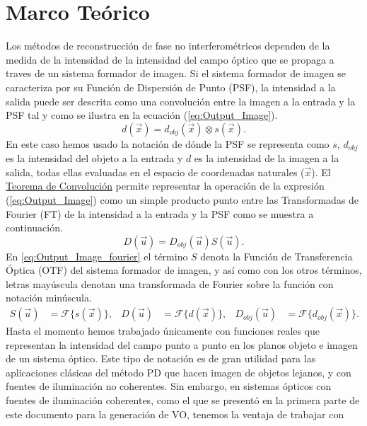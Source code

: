 \section{Marco Teórico}
\label{sec:ChPD_marco_teorico}
Los métodos de reconstrucción de fase no interferométricos dependen de
la medida de la intensidad de la intensidad del campo óptico que se
propaga a traves de un sistema formador de imagen. Si el sistema
formador de imagen se
caracteriza por su Función de Dispersión de Punto (PSF), la intensidad
a la salida puede ser descrita como una convolución entre la imagen a
la entrada y la PSF tal y como se ilustra en la ecuación
(\ref{eq:Output_Image}).
\begin{equation}\label{eq:Output_Image}
d(\vec{x}) = d_{obj}(\vec{x}) \otimes s(\vec{x}).
\end{equation}
En este caso hemos usado la notación de  dónde
la PSF se representa como $s$, $d_{obj}$ es la intensidad del objeto a
la entrada y $d$ es la intensidad de la imagen a la salida, todas
ellas evaluadas en el espacio de coordenadas naturales ($\vec{x}$). El
 \href{http://es.wikipedia.org/wiki/Teorema_de_convolución}{Teorema de
   Convolución} permite representar la operación de la expresión
 (\ref{eq:Output_Image}) como un simple producto punto entre las
 Transformadas de Fourier (FT) de la intensidad a la entrada y la
 PSF como se muestra a continuación. 
\begin{equation}\label{eq:Output_Image_fourier}
D(\vec{u}) = D_{obj}(\vec{u})S(\vec{u}).
\end{equation}
En \ref{eq:Output_Image_fourier} el término $S$ denota la Función de
Transferencia Óptica (OTF) del sistema formador de imagen, y así como
con los otros términos, letras mayúscula denotan una transformada de
Fourier sobre la función con notación minúscula.
\begin{align*} 
S(\vec{u})&= \mathcal{F}\{ s(\vec{x}) \},&D(\vec{u})&= \mathcal{F}\{ d(\vec{x}) \}, &D_{obj}(\vec{u})&= \mathcal{F}\{ d_{obj}(\vec{x}) \}. 
\end{align*}
Hasta el momento hemos trabajado únicamente con funciones reales que
representan la intensidad del campo punto a punto en los planos objeto
e imagen de un sistema óptico. Este tipo de notación es de gran utilidad para las
aplicaciones clásicas del método PD que hacen imagen de objetos
lejanos, y con fuentes de iluminación no coherentes. Sin embargo, en
sistemas ópticos con fuentes de iluminación coherentes, como el que se presentó en la primera parte de este documento
para la generación de VO, tenemos la ventaja de trabajar con
